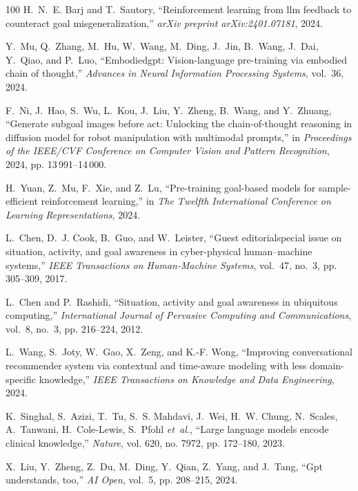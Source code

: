 \documentclass[10pt,journal,compsoc]{IEEEtran}
\begin{document}
\begin{thebibliography}{100}
	H.~N.~E. Barj and T.~Sautory, ``Reinforcement learning from llm feedback to
	counteract goal misgeneralization,'' \emph{arXiv preprint arXiv:2401.07181},
	2024.
	
	Y.~Mu, Q.~Zhang, M.~Hu, W.~Wang, M.~Ding, J.~Jin, B.~Wang, J.~Dai, Y.~Qiao, and
	P.~Luo, ``Embodiedgpt: Vision-language pre-training via embodied chain of
	thought,'' \emph{Advances in Neural Information Processing Systems}, vol.~36,
	2024.
	
	F.~Ni, J.~Hao, S.~Wu, L.~Kou, J.~Liu, Y.~Zheng, B.~Wang, and Y.~Zhuang,
	``Generate subgoal images before act: Unlocking the chain-of-thought
	reasoning in diffusion model for robot manipulation with multimodal
	prompts,'' in \emph{Proceedings of the IEEE/CVF Conference on Computer Vision
		and Pattern Recognition}, 2024, pp. 13\,991--14\,000.
	
	H.~Yuan, Z.~Mu, F.~Xie, and Z.~Lu, ``Pre-training goal-based models for
	sample-efficient reinforcement learning,'' in \emph{The Twelfth International
		Conference on Learning Representations}, 2024.
	
	L.~Chen, D.~J. Cook, B.~Guo, and W.~Leister, ``Guest editorialspecial issue on
	situation, activity, and goal awareness in cyber-physical human--machine
	systems,'' \emph{IEEE Transactions on Human-Machine Systems}, vol.~47, no.~3,
	pp. 305--309, 2017.
	
	L.~Chen and P.~Rashidi, ``Situation, activity and goal awareness in ubiquitous
	computing,'' \emph{International Journal of Pervasive Computing and
		Communications}, vol.~8, no.~3, pp. 216--224, 2012.
	
	L.~Wang, S.~Joty, W.~Gao, X.~Zeng, and K.-F. Wong, ``Improving conversational
	recommender system via contextual and time-aware modeling with less
	domain-specific knowledge,'' \emph{IEEE Transactions on Knowledge and Data
		Engineering}, 2024.
	
	K.~Singhal, S.~Azizi, T.~Tu, S.~S. Mahdavi, J.~Wei, H.~W. Chung, N.~Scales,
	A.~Tanwani, H.~Cole-Lewis, S.~Pfohl \emph{et~al.}, ``Large language models
	encode clinical knowledge,'' \emph{Nature}, vol. 620, no. 7972, pp. 172--180,
	2023.
	
	X.~Liu, Y.~Zheng, Z.~Du, M.~Ding, Y.~Qian, Z.~Yang, and J.~Tang, ``Gpt
	understands, too,'' \emph{AI Open}, vol.~5, pp. 208--215, 2024.
	

\end{thebibliography}
\end{document}

